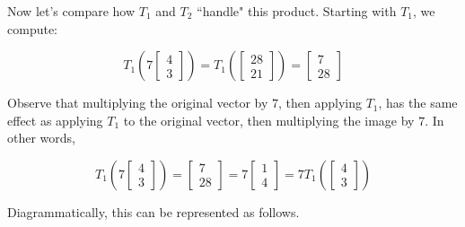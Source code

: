 \documentclass{ximera}
\begin{document}
\begin{exploration}
Now let's compare how $T_1$ and $T_2$ ``handle" this product.  Starting with $T_1$, we compute:

$$
T_1\left(7\begin{bmatrix}
4\\
3
\end{bmatrix}\right)=T_1\left(\begin{bmatrix}
28\\
21
\end{bmatrix}\right)=\begin{bmatrix}
7\\
28
\end{bmatrix} 
$$

Observe that multiplying the original vector by $7$, then applying $T_1$, has the same effect as applying $T_1$ to the original vector, then multiplying the image by $7$.  In other words,

$$
T_1\left(7\begin{bmatrix}
4\\
3
\end{bmatrix}\right)=\begin{bmatrix}
7\\
28
\end{bmatrix}=7\begin{bmatrix}
1\\
4
\end{bmatrix}=7T_1\left(\begin{bmatrix}
4\\
3
\end{bmatrix}\right)$$

Diagrammatically, this can be represented as follows.

\begin{center}
\end{center}
\end{exploration}
\end{document}
